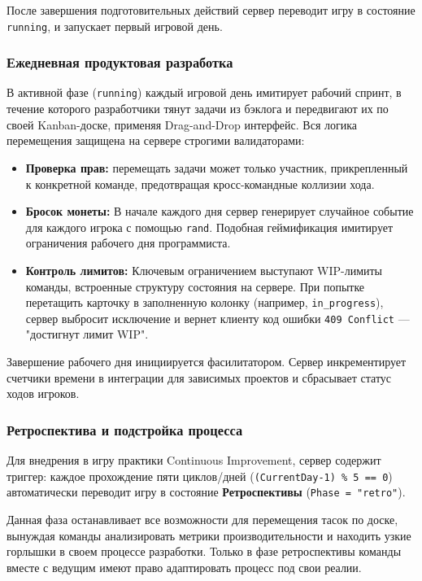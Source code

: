 После завершения подготовительных действий сервер переводит игру в состояние \texttt{running}, и запускает первый игровой день.

\subsubsection{Ежедневная продуктовая разработка}

В активной фазе (\texttt{running}) каждый игровой день имитирует рабочий спринт, в течение которого разработчики тянут задачи из бэклога и передвигают их по своей Kanban-доске, применяя Drag-and-Drop интерфейс. Вся логика перемещения защищена на сервере строгими валидаторами:
\begin{itemize}
    \item \textbf{Проверка прав:} перемещать задачи может только участник, прикрепленный к конкретной команде, предотвращая кросс-командные коллизии хода.
    \item \textbf{Бросок монеты:} В начале каждого дня сервер генерирует случайное событие для каждого игрока с помощью \texttt{rand}. Подобная геймификация имитирует ограничения рабочего дня программиста.
    \item \textbf{Контроль лимитов:} Ключевым ограничением выступают WIP-лимиты команды, встроенные структуру состояния на сервере. При попытке перетащить карточку в заполненную колонку (например, \texttt{in\_progress}), сервер выбросит исключение и вернет клиенту код ошибки \texttt{409 Conflict} — "достигнут лимит WIP".
\end{itemize}
Завершение рабочего дня инициируется фасилитатором. Сервер инкрементирует счетчики времени в интеграции для зависимых проектов и сбрасывает статус ходов игроков.

\subsubsection{Ретроспектива и подстройка процесса}

Для внедрения в игру практики Continuous Improvement, сервер содержит триггер: каждое прохождение пяти циклов/дней (\texttt{(CurrentDay-1) \% 5 == 0}) автоматически переводит игру в состояние \textbf{Ретроспективы} (\texttt{Phase = "retro"}).

Данная фаза останавливает все возможности для перемещения тасок по доске, вынуждая команды анализировать метрики производительности и находить узкие горлышки в своем процессе разработки. Только в фазе ретроспективы команды вместе с ведущим имеют право адаптировать процесс под свои реалии.

